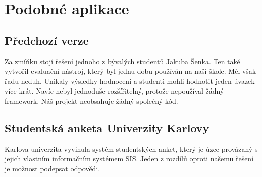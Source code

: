 \section{Podobné aplikace}
\subsection{Předchozí verze}\label{uvod:predchozi-verze}
Za zmíňku stojí řešení jednoho z bývalých studentů Jakuba Šenka. Ten také vytvořil evaluační nástroj, který byl jednu dobu používán na naší škole. Měl však řadu neduh. Unikaly výsledky hodnocení a studenti mohli hodnotit jeden úvazek více krát.  Navíc nebyl jednoduše rozšířitelný, protože nepoužíval žádný framework. Náš projekt neobsahuje žádný společný kód.
\subsection{Studentská anketa Univerzity Karlovy}
Karlova univerzita vyvinula systém studentských anket, který je úzce provázaný s jejich vlastním informačním systémem SIS.  Jeden z rozdílů oproti našemu řešení je možnost podepsat odpovědi.\cite{matfyz-anketa}

